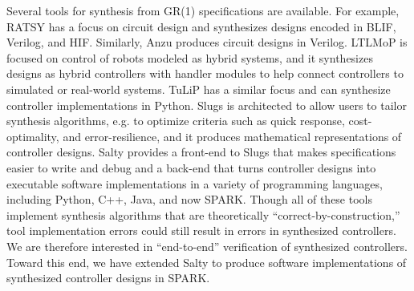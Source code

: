 \documentclass[runningheads]{llncs}
\begin{document}
Several tools for synthesis from GR(1) specifications are available. 
For example, RATSY %
\cite{bloem2010ratsy} has a focus on circuit design and synthesizes designs 
encoded in BLIF, %
Verilog, and HIF. %
Similarly, Anzu \cite{jobstmann2007anzu} produces circuit designs in Verilog.
LTLMoP 
\cite{finucane2010ltlmop} is focused on control of robots modeled as hybrid systems, 
and it synthesizes designs as hybrid controllers with handler modules to help connect controllers to simulated or real-world systems. 
TuLiP 
\cite{TuLiP2011} has a similar focus and can synthesize controller implementations in Python. 
Slugs 
\cite{Ehlers2016} is architected to allow users to tailor synthesis algorithms,
 e.g. to optimize criteria such as quick response, cost-optimality, and error-resilience, and it produces mathematical representations of controller designs.
Salty \cite{elliott2019salty} provides a front-end to Slugs that makes specifications easier to write and debug and 
a back-end that turns controller designs into executable software implementations in a variety of programming languages, 
including Python, C++, Java, and now SPARK. 
Though all of these tools implement synthesis algorithms that are theoretically ``correct-by-construction,''
tool implementation errors could still result in errors in synthesized controllers.
We are therefore interested in ``end-to-end'' verification of synthesized controllers.
Toward this end, we have extended Salty to produce software implementations of synthesized controller designs in SPARK.
\end{document}
